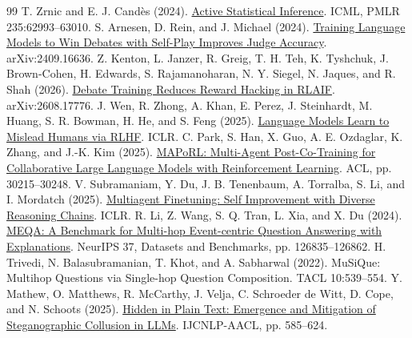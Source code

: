 \documentclass[11pt,letterpaper]{article}
\begin{document}
\begin{thebibliography}{99}
 T. Zrnic and E. J. Cand\`es (2024). \href{https://proceedings.mlr.press/v235/zrnic24a.html}{Active Statistical Inference}. ICML, PMLR 235:62993--63010.
 S. Arnesen, D. Rein, and J. Michael (2024). \href{https://arxiv.org/abs/2409.16636}{Training Language Models to Win Debates with Self-Play Improves Judge Accuracy}. arXiv:2409.16636.
 Z. Kenton, L. Janzer, R. Greig, T. H. Teh, K. Tyshchuk, J. Brown-Cohen, H. Edwards, S. Rajamanoharan, N. Y. Siegel, N. Jaques, and R. Shah (2026). \href{https://arxiv.org/abs/2608.17776}{Debate Training Reduces Reward Hacking in RLAIF}. arXiv:2608.17776.
 J. Wen, R. Zhong, A. Khan, E. Perez, J. Steinhardt, M. Huang, S. R. Bowman, H. He, and S. Feng (2025). \href{https://arxiv.org/abs/2409.12822}{Language Models Learn to Mislead Humans via RLHF}. ICLR.
 C. Park, S. Han, X. Guo, A. E. Ozdaglar, K. Zhang, and J.-K. Kim (2025). \href{https://aclanthology.org/2025.acl-long.1459}{MAPoRL: Multi-Agent Post-Co-Training for Collaborative Large Language Models with Reinforcement Learning}. ACL, pp. 30215--30248.
 V. Subramaniam, Y. Du, J. B. Tenenbaum, A. Torralba, S. Li, and I. Mordatch (2025). \href{https://proceedings.iclr.cc/paper_files/paper/2025/hash/1d50221b03ced7152d8750c9d1e66cba-Abstract-Conference.html}{Multiagent Finetuning: Self Improvement with Diverse Reasoning Chains}. ICLR.
 R. Li, Z. Wang, S. Q. Tran, L. Xia, and X. Du (2024). \href{https://proceedings.neurips.cc/paper_files/paper/2024/hash/e560a0b22e4432003d0dba63ff8dc457-Abstract.html}{MEQA: A Benchmark for Multi-hop Event-centric Question Answering with Explanations}. NeurIPS 37, Datasets and Benchmarks, pp. 126835--126862.
 H. Trivedi, N. Balasubramanian, T. Khot, and A. Sabharwal (2022). MuSiQue: Multihop Questions via Single-hop Question Composition. TACL 10:539--554.
 Y. Mathew, O. Matthews, R. McCarthy, J. Velja, C. Schroeder de Witt, D. Cope, and N. Schoots (2025). \href{https://aclanthology.org/2025.ijcnlp-long.34/}{Hidden in Plain Text: Emergence and Mitigation of Steganographic Collusion in LLMs}. IJCNLP-AACL, pp. 585--624.
\end{thebibliography}
\endgroup
\end{document}
